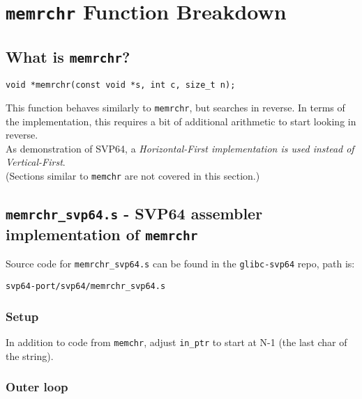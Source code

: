 \section{\texttt{memrchr} Function Breakdown}

\subsection{What is \texttt{memrchr}?}

\begin{verbatim}
void *memrchr(const void *s, int c, size_t n);
\end{verbatim}

This function behaves similarly to \texttt{memrchr}, but searches in reverse.
In terms of the implementation, this requires a bit of additional arithmetic
to start looking in reverse.\\

As demonstration of SVP64, a \textit{Horizontal-First implementation is used
instead of Vertical-First}.\\

(Sections similar to \texttt{memchr} are not covered in this section.)

\subsection{\texttt{memrchr\_svp64.s} - SVP64 assembler implementation of \texttt{memrchr}}

Source code for \texttt{memrchr\_svp64.s} can be found in the
\texttt{glibc-svp64} repo, path is:
\begin{verbatim}
svp64-port/svp64/memrchr_svp64.s
\end{verbatim}

\subsubsection{Setup}

In addition to code from \texttt{memchr}, adjust \texttt{in\_ptr}
to start at N-1 (the last char of the string).

\subsubsection{Outer loop}

